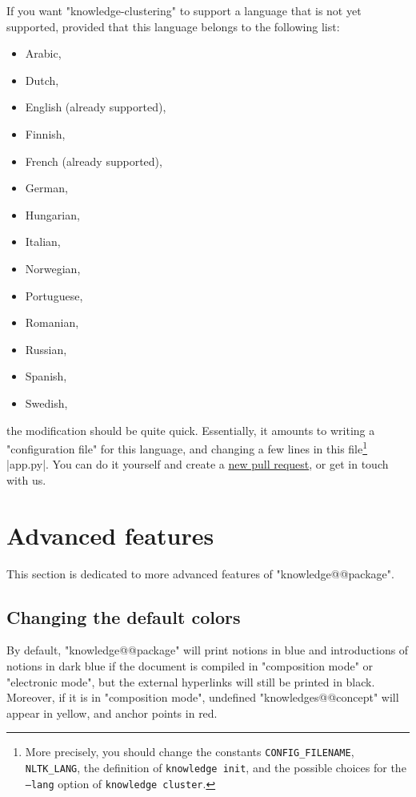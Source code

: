 \documentclass{article}
\begin{document}
If you want "knowledge-clustering" to support a language that is not yet 
supported, provided that this language belongs to the following list:
\begin{multicols}{2}
    \begin{itemize}
        \item Arabic,
        \item Dutch,
        \item English (already supported),
        \item Finnish,
        \item French (already supported),
        \item German,
        \item Hungarian,
        \item Italian,
        \item Norwegian,
        \item Portuguese,
        \item Romanian,
        \item Russian,
        \item Spanish,
        \item Swedish,
    \end{itemize}
\end{multicols}
the modification should be quite quick. Essentially, it amounts to writing a
"configuration file" for this language, and changing a few lines
in this file\footnote{More precisely, you should change the constants
\texttt{CONFIG\_FILENAME}, \texttt{NLTK\_LANG}, the definition of
\texttt{knowledge init}, and the possible choices for the \texttt{--lang}
option of \texttt{knowledge cluster}.} \spverb|app.py|.
You can do it yourself and create a \href{https://github.com/remimorvan/knowledge-clustering/pulls}{new pull request},
or get in touch with us.



\section{Advanced features}
\label{sec:advanced-features}

This section is dedicated to more advanced features of "knowledge@@package".

\subsection{Changing the default colors}

By default, "knowledge@@package" will print notions in blue and
introductions of notions in dark blue if the document is compiled
in "composition mode" or "electronic mode", but the external hyperlinks
will still be printed in black. Moreover, if it is in
"composition mode", undefined "knowledges@@concept" will appear in yellow,
and anchor points in red.
\end{document}
